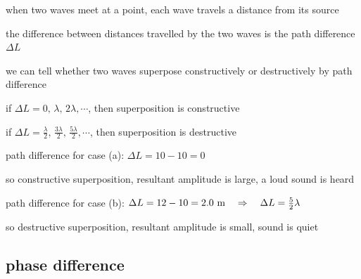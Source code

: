 when two waves meet at a point, each wave travels a distance from its source

the difference between distances travelled by the two waves is the path difference $\Delta L$

\cmt we can tell whether two waves superpose constructively or destructively by path difference

{

\centering
\vspace*{6pt}
\begin{tcolorbox}[colframe=red, colback=yellow!30, width=0.65\textwidth]
	\setlength{\baselineskip}{\baselineskip}%
	
	\centering
	
	if ${\Delta L = 0, \, \lambda, \, 2\lambda, \cdots}$, then superposition is constructive
	
	if ${\Delta L = \frac{\lambda}{2}, \, \frac{3\lambda}{2}, \, \frac{5\lambda}{2}, \cdots}$, then superposition is destructive
	
\end{tcolorbox}\vspace*{-4pt}

}

\newpage


\begin{soln} path difference for case (a): $\Delta L = 10 - 10  = 0$

so constructive superposition, resultant amplitude is large, a loud sound is heard

path difference for case (b): $\Delta L = 12 - 10 = 2.0 \text{ m} \quad \Rightarrow \quad \Delta L = \frac{5}{2}\lambda$

so destructive superposition, resultant amplitude is small, sound is quiet \end{soln}

\subsection{phase difference}

